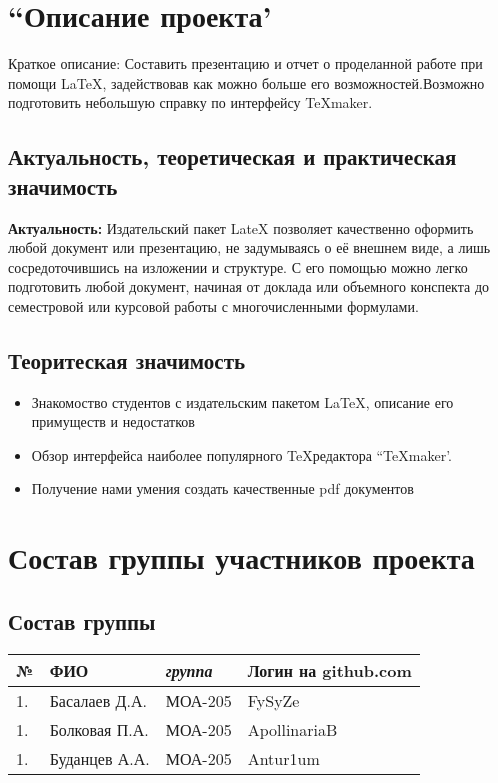 \documentclass[12pt, a4paper]{article}
\begin{document}
\newpage%
\tableofcontents


\newpage%
\section{``Описание проекта'}
Краткое описание: Составить презентацию и отчет о проделанной работе при помощи \LaTeX, задействовав как можно больше его возможностей.Возможно подготовить небольшую справку по интерфейсу \TeX maker.
\subsection{Актуальность, теоретическая и практическая значимость}
\textbf{Актуальность:}
Издательский пакет LateX позволяет качественно оформить любой документ или презентацию, не задумываясь о её внешнем виде, а лишь сосредоточившись на изложении и структуре. С его помощью можно легко подготовить любой документ, начиная от доклада или объемного конспекта до семестровой или курсовой работы с многочисленными формулами.
\subsection{Теоритеская значимость}
\begin{itemize}
  \item Знакомоство студентов с издательским пакетом \LaTeX, описание его примуществ и недостатков
  \item Обзор интерфейса наиболее популярного \TeX редактора ``\TeX maker'.
 \item Получение нами умения создать качественные pdf документов 
\end{itemize} 
\section{Состав группы участников проекта}
\subsection{Состав группы}
\begin{tabular}{| l| l| l| l|}
\hline {\bfseries \large №} & {\bfseries \large ФИО} & {\bfseries \large \textsl{группа}} & {\bfseries \large Логин на github.com } \\ \hline
1. & Басалаев Д.А.  & МОА-205 & FySyZe \\ \hline
1. & Болковая П.А.  & МОА-205 & ApollinariaB \\ \hline
1. & Буданцев А.А.  & МОА-205 & Antur1um \\ \hline
\end{tabular}
\end{document}
